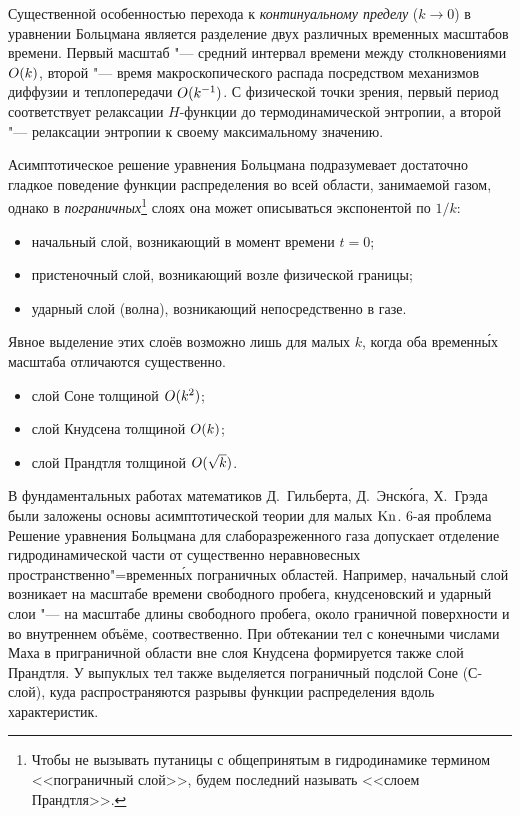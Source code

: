 Существенной особенностью перехода к \emph{континуальному пределу} (\(k\to0\)) в уравнении Больцмана
является разделение двух различных временных масштабов времени. Первый масштаб "--- средний интервал
времени между столкновениями \(O(k)\), второй "--- время макроскопического распада посредством
механизмов диффузии и теплопередачи \(O(k^{-1})\).
С физической точки зрения, первый период соответствует релаксации \(H\)-функции до термодинамической
энтропии, а второй "--- релаксации энтропии к своему максимальному значению.

Асимптотическое решение уравнения Больцмана подразумевает достаточно гладкое поведение
функции распределения во всей области, занимаемой газом, однако в \emph{пограничных}\footnote{
    Чтобы не вызывать путаницы с общепринятым в гидродинамике термином <<пограничный слой>>,
    будем последний называть <<слоем Прандтля>>.
} слоях она может описываться экспонентой по \(1/k\):
\begin{itemize}
    \item начальный слой, возникающий в момент времени \(t=0\);
    \item пристеночный слой, возникающий возле физической границы;
    \item ударный слой (волна), возникающий непосредственно в газе.
\end{itemize}
Явное выделение этих слоёв возможно лишь для малых \(k\),
когда оба временн\'{ы}х масштаба отличаются существенно.



\begin{itemize}
    \item слой Соне толщиной \(O(k^2)\);
    \item слой Кнудсена толщиной \(O(k)\);
    \item слой Прандтля толщиной \(O(\sqrt{k})\).
\end{itemize}


В фундаментальных работах математиков Д.~Гильберта, Д.~Энск\'{о}га, Х.~Грэда
были заложены основы асимптотической теории для малых \(\mathrm{Kn}\).
6-ая проблема
Решение уравнения Больцмана для слаборазреженного газа допускает отделение гидродинамической части
от существенно неравновесных пространственно"=временн\'{ы}х пограничных областей.
Например, начальный слой возникает на масштабе времени свободного пробега,
кнудсеновский и ударный слои "--- на масштабе длины свободного пробега,
около граничной поверхности и во внутреннем объёме, соотвественно.
При обтекании тел с конечными числами Маха в приграничной области вне слоя Кнудсена
формируется также слой Прандтля. У выпуклых тел также выделяется пограничный подслой Соне (С-слой),
куда распространяются разрывы функции распределения вдоль характеристик.

